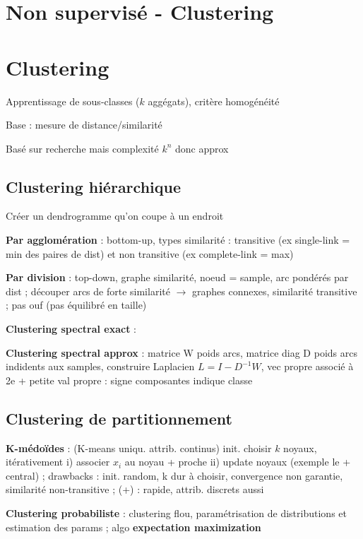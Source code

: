 \section*{Non supervisé - Clustering}


\section*{Clustering}

Apprentissage de sous-classes ($k$ aggégats), critère homogénéité

Base : mesure de distance/similarité

Basé sur recherche mais complexité $k^n$ donc approx

\subsection*{Clustering hiérarchique}

Créer un dendrogramme qu'on coupe à un endroit

\textbf{Par agglomération} : bottom-up, types similarité : transitive (ex single-link = min des paires de dist) et non transitive (ex complete-link = max)

\textbf{Par division} : top-down, graphe similarité, noeud = sample, arc pondérés par dist ; découper arcs de forte similarité $\rightarrow$ graphes connexes, similarité transitive ; pas ouf (pas équilibré en taille)

\textbf{Clustering spectral exact} : %

\textbf{Clustering spectral approx} : matrice W poids arcs, matrice diag D poids arcs indidents aux samples, construire Laplacien $L = I - D^{-1}W$, vec propre associé à 2e + petite val propre : signe composantes indique classe


\subsection*{Clustering de partitionnement}

\textbf{K-médoïdes} : (K-means uniqu. attrib. continus) init. choisir $k$ noyaux, itérativement i) associer $x_i$ au noyau + proche ii) update noyaux (exemple le + central) ; drawbacks : init. random, k dur à choisir, convergence non garantie, similarité non-transitive ; (+) : rapide, attrib. discrets aussi

\textbf{Clustering probabiliste} : clustering flou, paramétrisation de distributions et estimation des params  ; algo \textbf{expectation maximization}


